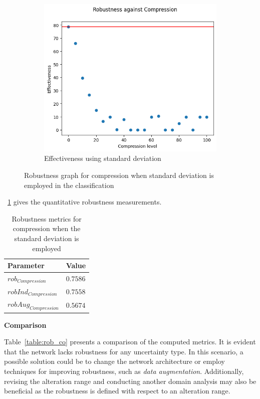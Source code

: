 \begin{figure}[h]
	\begin{subfigure}{.33\textwidth}
		\centering
		\includegraphics[width=0.9\linewidth]{ImageFiles/EvalBNN/CO/VU/eff}
		\caption{Effectiveness using standard deviation}
		\label{fig:co_vu_eff}
	\end{subfigure}
	\caption{Robustness graph for compression when standard deviation is employed in the classification}
	\label{fig:co_vu}
\end{figure}

\Tab~\ref{table:rob_co_vu} gives the quantitative robustness measurements.

\begin{table}[h]
	\centering
	\begin{tabular}{|| l | l ||} 
		\hline
		\textbf{Parameter} & \textbf{Value} \\
		\hline
		\hline
		$rob_{Compression}$ & $0.7586$ \\
		$robInd_{Compression}$ & $0.7558$ \\
		$robAug_{Compression}$ & $0.5674$ \\	
		\hline
	\end{tabular}	
	\caption{Robustness metrics for compression when the standard deviation is employed}
	\label{table:rob_co_vu}
\end{table}

\vspace{0.3cm}
\textbf{Comparison}
\vspace{0.1cm}

Table~\ref{table:rob_co} presents a comparison of the computed metrics. It is evident that the network lacks robustness for any uncertainty type. In this scenario, a possible solution could be to change the network architecture or employ techniques for improving robustness, such as \textit{data augmentation}. Additionally, revising the alteration range and conducting another domain analysis may also be beneficial as the robustness is defined with respect to an alteration range.

